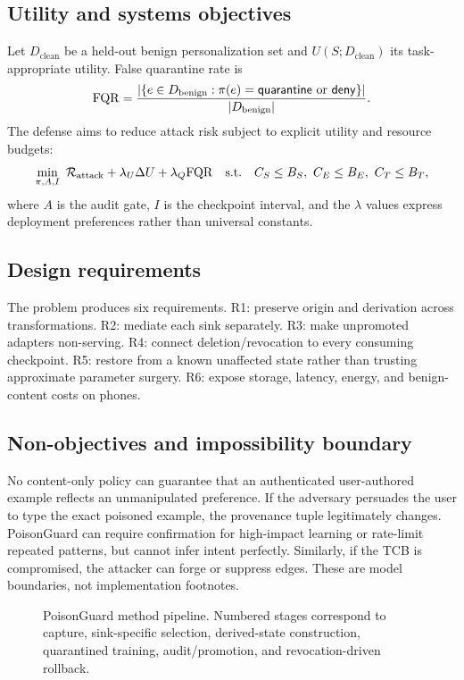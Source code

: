\subsection{Utility and systems objectives}

Let $D_{\mathrm{clean}}$ be a held-out benign personalization set and $U(S;D_{\mathrm{clean}})$ its task-appropriate utility. False quarantine rate is
\begin{equation}
\mathrm{FQR}=\frac{|\{e\in D_{\mathrm{benign}}:\pi(e)=\mathsf{quarantine}\text{ or }\mathsf{deny}\}|}{|D_{\mathrm{benign}}|}.
\end{equation}
The defense aims to reduce attack risk subject to explicit utility and resource budgets:
\begin{equation}
\min_{\pi,A,I} \ \Risk_{\mathrm{attack}}+\lambda_U\Delta U+\lambda_Q\mathrm{FQR}
\quad\text{s.t.}\quad C_S\le B_S,\ C_E\le B_E,\ C_T\le B_T,
\label{eq:objective}
\end{equation}
where $A$ is the audit gate, $I$ is the checkpoint interval, and the $\lambda$ values express deployment preferences rather than universal constants.

\subsection{Design requirements}

The problem produces six requirements. R1: preserve origin and derivation across transformations. R2: mediate each sink separately. R3: make unpromoted adapters non-serving. R4: connect deletion/revocation to every consuming checkpoint. R5: restore from a known unaffected state rather than trusting approximate parameter surgery. R6: expose storage, latency, energy, and benign-content costs on phones.

\subsection{Non-objectives and impossibility boundary}

No content-only policy can guarantee that an authenticated user-authored example reflects an unmanipulated preference. If the adversary persuades the user to type the exact poisoned example, the provenance tuple legitimately changes. PoisonGuard can require confirmation for high-impact learning or rate-limit repeated patterns, but cannot infer intent perfectly. Similarly, if the TCB is compromised, the attacker can forge or suppress edges. These are model boundaries, not implementation footnotes.

\begin{figure}[t]
  \centering
  \resizebox{0.95\columnwidth}{!}{}
  \caption{PoisonGuard method pipeline. Numbered stages correspond to capture, sink-specific selection, derived-state construction, quarantined training, audit/promotion, and revocation-driven rollback.}
  \label{fig:pipeline}
\end{figure}
